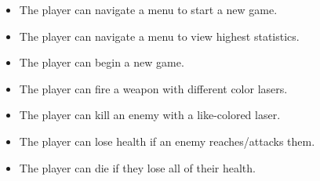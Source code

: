 \begin{itemize}
    \item The player can navigate a menu to start a new game.
    \item The player can navigate a menu to view highest statistics.
    \item The player can begin a new game.
    \item The player can fire a weapon with different color lasers.
    \item The player can kill an enemy with a like-colored laser.
    \item The player can lose health if an enemy reaches/attacks them.
    \item The player can die if they lose all of their health.
\end{itemize}
